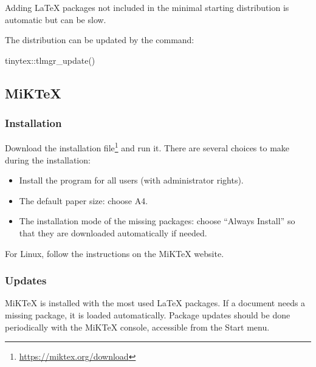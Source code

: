 \documentclass[
  12pt,
  american,
  a4paper,
  extrafontsizes,onecolumn,openright
  ]{memoir}
\newenvironment{Shaded}{\begin{snugshade}}{\end{snugshade}}
\newcommand{\FunctionTok}[1]{\textcolor[rgb]{0.00,0.00,0.00}{#1}}
\newcommand{\NormalTok}[1]{#1}
\newcommand{\SpecialCharTok}[1]{\textcolor[rgb]{0.00,0.00,0.00}{#1}}
\providecommand{\tightlist}{%
  \setlength{\itemsep}{0pt}\setlength{\parskip}{0pt}}
\begin{document}
\normalsize

Adding LaTeX packages not included in the minimal starting distribution is automatic but can be slow.

The distribution can be updated by the command:

\scriptsize

\begin{Shaded}
\begin{Highlighting}[]
\NormalTok{tinytex}\SpecialCharTok{::}\FunctionTok{tlmgr\_update}\NormalTok{()}
\end{Highlighting}
\end{Shaded}

\normalsize

\hypertarget{miktex}{%
\subsection{MiKTeX}\label{miktex}}

\hypertarget{installation-2}{%
\subsubsection{Installation}\label{installation-2}}

Download the installation file\footnote{\url{https://miktex.org/download}} and run it.
There are several choices to make during the installation:

\begin{itemize}
\tightlist
\item
  Install the program for all users (with administrator rights).
\item
  The default paper size: choose A4.
\item
  The installation mode of the missing packages: choose \enquote{Always Install} so that they are downloaded automatically if needed.
\end{itemize}

For Linux, follow the instructions on the MiKTeX website.

\hypertarget{updates}{%
\subsubsection{Updates}\label{updates}}

MiKTeX is installed with the most used LaTeX packages.
If a document needs a missing package, it is loaded automatically.
Package updates should be done periodically with the MiKTeX console, accessible from the Start menu.
\end{document}
